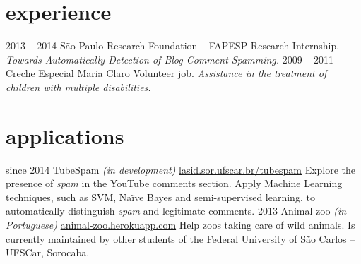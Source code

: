 \documentclass[]{friggeri-cv}
\begin{document}
\section{experience}

\begin{entrylist}
  \entry
    {2013 – 2014}
    {São Paulo Research Foundation – FAPESP}
    {Research Internship.}
    {\emph{Towards Automatically Detection of Blog Comment Spamming.}}
  \entry
    {2009 – 2011}
    {Creche Especial Maria Claro}
    {Volunteer job.}
    {\emph{Assistance in the treatment of children with multiple disabilities.}}
\end{entrylist}

\section{applications}

\begin{entrylist}
  \entry
    {since 2014}
    {TubeSpam \emph{(in development)}}
    {\href{http://lasid.sor.ufscar.br/tubespam}{lasid.sor.ufscar.br/tubespam}}
    {Explore the presence of \emph{spam} in the YouTube comments section. Apply Machine Learning techniques, such as SVM, Na\"ive Bayes and semi-supervised learning, to automatically distinguish \emph{spam} and legitimate comments.}
  \entry
    {2013}
    {Animal-zoo \emph{(in Portuguese)}}
    {\href{http://animal-zoo.herokuapp.com}{animal-zoo.herokuapp.com}}
    {Help zoos taking care of wild animals. Is currently maintained by other students of the Federal University of São Carlos -- UFSCar, Sorocaba.}
\end{entrylist}
\end{document}
